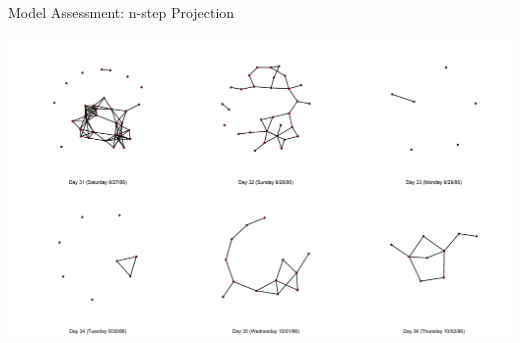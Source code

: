 \documentclass[10pt]{beamer}
\begin{document}
\begin{frame}{Model Assessment: n-step Projection}


\begin{center}
\includegraphics[width=1\linewidth]{graphics/nstep}
\end{center}
\end{frame}
\end{document}
